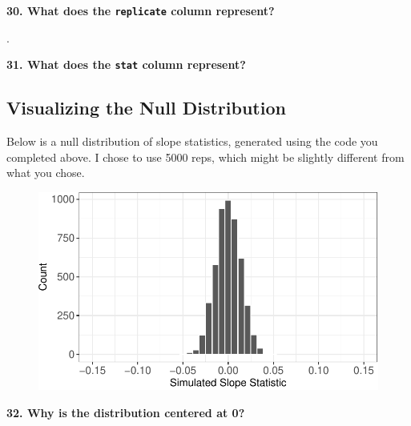 \documentclass[
  letterpaper,
  DIV=11,
  numbers=noendperiod]{scrartcl}
\begin{document}
\vspace{0.1in}

\textbf{30. What does the \texttt{replicate} column represent?}

.

\vspace{0.5cm}

\textbf{31. What does the \texttt{stat} column represent?}


\vspace{0.5cm}

\hypertarget{visualizing-the-null-distribution}{%
\subsection{Visualizing the Null
Distribution}\label{visualizing-the-null-distribution}}

Below is a null distribution of slope statistics, generated using the
code you completed above. I chose to use 5000 reps, which might be
slightly different from what you chose.

\begin{figure}

{\centering \includegraphics{activity4-diving-penguins-key_files/figure-pdf/null-viz-1.pdf}

}

\end{figure}

\vspace{0.2in}

\textbf{32. Why is the distribution centered at 0?}
\end{document}

